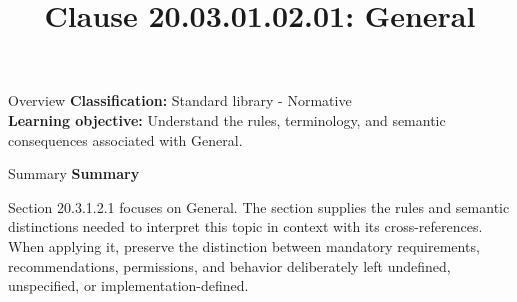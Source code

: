 \documentclass[10pt,letterpaper]{article}
\title{Clause 20.03.01.02.01: General}
\author{}
\date{}
\begin{document}
\maketitle
\begin{CornellOverviewBox}{Overview}
\textbf{Classification:} Standard library - Normative\\[2pt]
\textbf{Learning objective:} Understand the rules, terminology, and semantic consequences associated with General.
\end{CornellOverviewBox}\begin{CornellSummaryBox}{Summary}
{\sffamily\bfseries\color{Accent} Summary}\par\vspace{3pt}Section 20.3.1.2.1 focuses on General. The section supplies the rules and semantic distinctions needed to interpret this topic in context with its cross-references. When applying it, preserve the distinction between mandatory requirements, recommendations, permissions, and behavior deliberately left undefined, unspecified, or implementation-defined.
\end{CornellSummaryBox}
\end{document}
